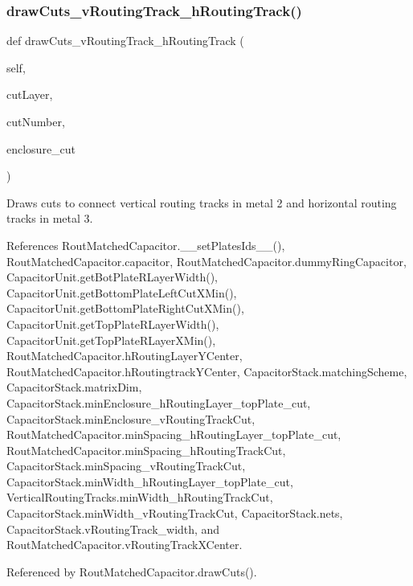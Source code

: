 \subsubsection{\texorpdfstring{draw\+Cuts\+\_\+v\+Routing\+Track\+\_\+h\+Routing\+Track()}{drawCuts\_vRoutingTrack\_hRoutingTrack()}}
{\footnotesize\ttfamily def draw\+Cuts\+\_\+v\+Routing\+Track\+\_\+h\+Routing\+Track (\begin{DoxyParamCaption}\item[{}]{self,  }\item[{}]{cut\+Layer,  }\item[{}]{cut\+Number,  }\item[{}]{enclosure\+\_\+cut }\end{DoxyParamCaption})}



Draws cuts to connect vertical routing tracks in metal 2 and horizontal routing tracks in metal 3. 



References Rout\+Matched\+Capacitor.\+\_\+\+\_\+set\+Plates\+Ids\+\_\+\+\_\+(), Rout\+Matched\+Capacitor.\+capacitor, Rout\+Matched\+Capacitor.\+dummy\+Ring\+Capacitor, Capacitor\+Unit.\+get\+Bot\+Plate\+R\+Layer\+Width(), Capacitor\+Unit.\+get\+Bottom\+Plate\+Left\+Cut\+X\+Min(), Capacitor\+Unit.\+get\+Bottom\+Plate\+Right\+Cut\+X\+Min(), Capacitor\+Unit.\+get\+Top\+Plate\+R\+Layer\+Width(), Capacitor\+Unit.\+get\+Top\+Plate\+R\+Layer\+X\+Min(), Rout\+Matched\+Capacitor.\+h\+Routing\+Layer\+Y\+Center, Rout\+Matched\+Capacitor.\+h\+Routingtrack\+Y\+Center, Capacitor\+Stack.\+matching\+Scheme, Capacitor\+Stack.\+matrix\+Dim, Capacitor\+Stack.\+min\+Enclosure\+\_\+h\+Routing\+Layer\+\_\+top\+Plate\+\_\+cut, Capacitor\+Stack.\+min\+Enclosure\+\_\+v\+Routing\+Track\+Cut, Rout\+Matched\+Capacitor.\+min\+Spacing\+\_\+h\+Routing\+Layer\+\_\+top\+Plate\+\_\+cut, Rout\+Matched\+Capacitor.\+min\+Spacing\+\_\+h\+Routing\+Track\+Cut, Capacitor\+Stack.\+min\+Spacing\+\_\+v\+Routing\+Track\+Cut, Capacitor\+Stack.\+min\+Width\+\_\+h\+Routing\+Layer\+\_\+top\+Plate\+\_\+cut, Vertical\+Routing\+Tracks.\+min\+Width\+\_\+h\+Routing\+Track\+Cut, Capacitor\+Stack.\+min\+Width\+\_\+v\+Routing\+Track\+Cut, Capacitor\+Stack.\+nets, Capacitor\+Stack.\+v\+Routing\+Track\+\_\+width, and Rout\+Matched\+Capacitor.\+v\+Routing\+Track\+X\+Center.



Referenced by Rout\+Matched\+Capacitor.\+draw\+Cuts().

\mbox{\label{classpython_1_1capacitorrouted_1_1RoutMatchedCapacitor_a933728945d2d4a9d641ef93bf669d3b1}} 
